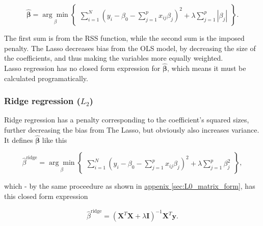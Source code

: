 \documentclass[../main.tex]{subfiles}
\begin{document}
\begin{equation}
  \label{eq:L1_algo}
  \hat{\mathbf \beta} = \underset{\beta}{\arg \min} \begin{Bmatrix}\sum_{i=1}^N\left(y_i - \beta_0 - \sum_{j=1}^p x_{ij}\beta_j\right)^2 + \lambda \sum_{j=1}^p |\beta_j| \end{Bmatrix} .
\end{equation}

The first sum is from the RSS function, while the second sum is the imposed penalty. The Lasso decreases bias from the OLS model, by decreasing the size of the coefficients, and thus making the variables more equally weighted. \\

Lasso regression has no closed form expression for $\hat{\mathbf \beta}$, which means it must be calculated programatically.


\subsubsection{Ridge regression ($L_2$)}
Ridge regression has a penalty corresponding to the coefficient's squared sizes, further decreasing the bias from The Lasso, but obviously also increases variance. It defines $\hat{\mathbf \beta}$ like this

\begin{equation*}
  \hat \beta^{\text{ridge}} = \underset{\beta}{\arg \min} \begin{Bmatrix}\sum_{i=1}^N\left(y_i - \beta_0 - \sum_{j=1}^p x_{ij}\beta_j\right)^2 + \lambda \sum_{j=1}^p \beta_j^2 \end{Bmatrix},
\end{equation*}

which - by the same proceedure as shown in \hyperref[sec:L0_matrix_form]{appenix \ref*{sec:L0_matrix_form}}, has this closed form expression

\begin{equation}
  \hat \beta^{\text{ridge}} = (\mathbf X^T\mathbf X + \lambda \mathbf I)^{-1}\mathbf X^T\mathbf y.
\end{equation}
\end{document}
